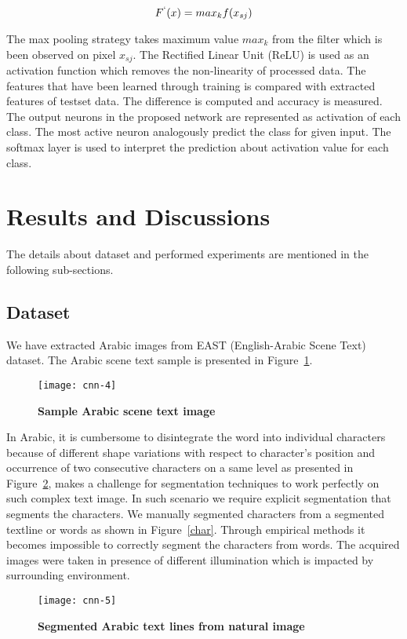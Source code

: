\documentclass[conference]{IEEEtran}
\begin{document}
\begin{equation}
F^{`}(x)= max_k f(x_{sj})
\end{equation}

The max pooling strategy takes maximum value $max_k$ from the filter which is been observed on pixel $x_{sj}$. 
The Rectified Linear Unit (ReLU) is used as an activation function which removes the non-linearity of processed data.
The features that have been learned through training is compared with extracted features of testset data.
The difference is computed and accuracy is measured. 
The output neurons in the proposed network are represented as activation of each class. 
The most active neuron analogously predict the class for given input. 
The softmax layer is used to interpret the prediction about activation value for each class.



\section{Results and Discussions}
The details about dataset and performed experiments are mentioned in the following sub-sections.

\subsection{Dataset}
We have extracted Arabic images from EAST (English-Arabic Scene Text) dataset. 
The Arabic scene text sample is presented in Figure~\ref{sample}.

\begin{figure}[H]
\centering
\texttt{[image: cnn-4]}
\caption{\bf Sample Arabic scene text image}
\label{sample}
\end{figure}
In Arabic, it is cumbersome to disintegrate the word into individual characters because of different shape variations with respect to character's position and occurrence of two consecutive characters on a same level as presented in Figure~\ref{segmented}, makes a challenge for segmentation techniques to work perfectly on such complex text image. 
In such scenario we require explicit segmentation that segments the characters. 
We manually segmented characters from a segmented textline or words as shown in Figure~\ref{char}.
Through empirical methods it becomes impossible to correctly segment the characters from words. 
The acquired images were taken in presence of different illumination which is impacted by surrounding environment. 
\begin{figure}[H]
\centering
\texttt{[image: cnn-5]}
\caption{\bf Segmented Arabic text lines from natural image}
\label{segmented}
\end{figure}
\end{document}

